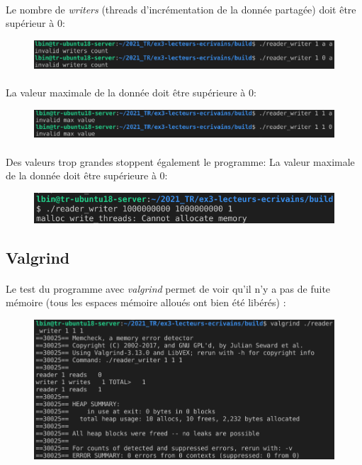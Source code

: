 \documentclass{article}
\begin{document}
    \paragraph{}
    Le nombre de \emph{writers} (threads d'incrémentation de la donnée partagée) doit être supérieur à 0:
    \begin{figure}[H]
        \centering
        \includegraphics[width=.8\textwidth]{./screenshots/invalid_writers_count.png}
    \end{figure}

    \paragraph{}
    La valeur maximale de la donnée doit être supérieure à 0:
    \begin{figure}[H]
        \centering
        \includegraphics[width=.8\textwidth]{./screenshots/invalid_max_value.png}
    \end{figure}

    \paragraph{}
    Des valeurs trop grandes stoppent également le programme:
    La valeur maximale de la donnée doit être supérieure à 0:
    \begin{figure}[H]
        \centering
        \includegraphics[width=.6\textwidth]{./screenshots/malloc_error.png}
    \end{figure}

    \newpage
    \subsection{Valgrind}
    \paragraph{}
    Le test du programme avec \emph{valgrind} permet de voir qu'il n'y a pas de fuite mémoire (tous les espaces mémoire alloués ont bien été libérés) :
    \begin{figure}[H]
        \centering
        \includegraphics[width=.8\textwidth]{./screenshots/test_valgrind.png}
    \end{figure}
\end{document}

